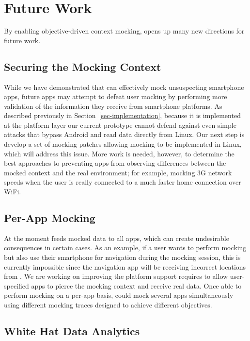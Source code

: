 \section{Future Work}
\label{sec-future}

By enabling objective-driven context mocking, \PocketMocker{} opens up many
new directions for future work.

\subsection{Securing the Mocking Context}

While we have demonstrated that \PocketMocker{} can effectively mock
unsuspecting smartphone apps, future apps may attempt to defeat user mocking
by performing more validation of the information they receive from smartphone
platforms. As described previously in Section~\ref{sec-implementation},
because it is implemented at the platform layer our current prototype cannot
defend against even simple attacks that bypass Android and read data directly
from Linux. Our next step is develop a set of mocking patches allowing mocking
to be implemented in Linux, which will address this issue. More work is needed,
however, to determine the best approaches to preventing apps from observing
differences between the mocked context and the real environment; for example,
mocking 3G network speeds when the user is really connected to a much faster
home connection over WiFi. 

\subsection{Per-App Mocking}

At the moment \PocketMocker{} feeds mocked data to all apps, which can create
undesirable consequences in certain cases. As an example, if a user wants to
perform mocking but also use their smartphone for navigation during the
mocking session, this is currently impossible since the navigation app will
be receiving incorrect locations from \PocketMocker{}. We are working on
improving the platform support \PocketMocker{} requires to allow
user-specified apps to pierce the mocking context and receive real data. Once
able to perform mocking on a per-app basis, \PocketMocker{} could mock
several apps simultaneously using different mocking traces designed to
achieve different objectives.

\subsection{White Hat Data Analytics}

